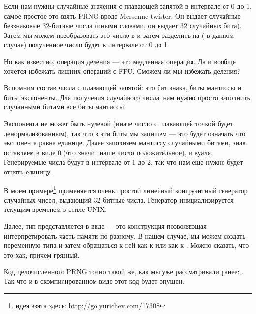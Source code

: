 \label{FPU_PRNG}

Если нам нужны случайные значения с плавающей запятой в интервале от 0 до 1, самое простое это взять
\ac{PRNG} вроде Mersenne twister.
Он выдает случайные беззнаковые 32-битные числа (иными словами, он выдает 32 случайных бита).
Затем мы можем преобразовать это число в \Tfloat и затем разделить на  ( в данном случае)\EMDASH{}
полученное число будет в интервале от 0 до 1.

Но как известно, операция деления --- это медленная операция. 
Да и вообще хочется избежать лишних операций с FPU.
Сможем ли мы избежать деления?

Вспомним состав числа с плавающей запятой: это бит знака, биты мантиссы и биты экспоненты. 
Для получения случайного числа, нам нужно просто заполнить случайными битами все биты мантиссы!

Экспонента не может быть нулевой (иначе число с плавающей точкой будет денормализованным), 
так что в эти биты мы запишем  --- это будет означать что экспонента равна единице.
Далее заполняем мантиссу случайными битами, знак оставляем в виде 0 (что значит наше число положительное), и вуаля.
Генерируемые числа будут в интервале от 1 до 2, так что нам еще нужно будет отнять единицу.

\newcommand{\URLXOR}{\url{http://go.yurichev.com/17308}}

В моем примере\footnote{идея взята здесь: \URLXOR} 
применяется очень простой линейный конгруэнтный генератор случайных чисел, выдающий 32-битные числа.
Генератор инициализируется текущим временем в стиле UNIX.

Далее, тип \Tfloat представляется в виде  --- это конструкция \CCpp позволяющая 
интерпретировать часть памяти по-разному. В нашем случае, мы можем создать переменную типа  
и затем обращаться к ней как к \Tfloat или как к . Можно сказать, что это хак, причем грязный.


Код целочисленного \ac{PRNG} точно такой же, как мы уже рассматривали ранее: .
Так что и в скомпилированном виде этот код будет опущен.






